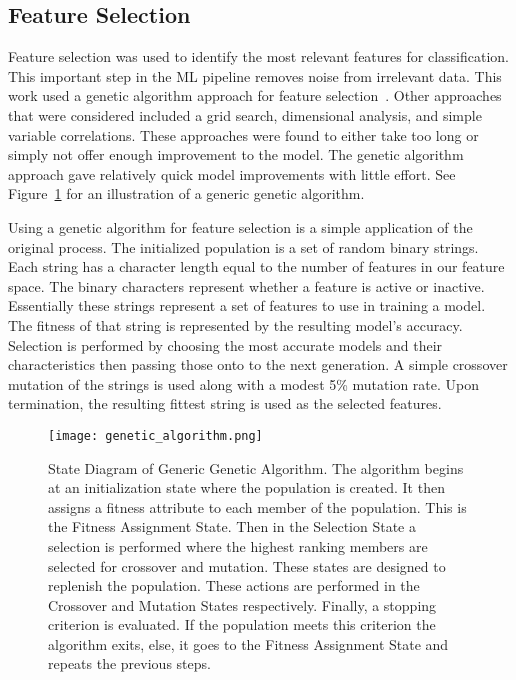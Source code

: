 \subsection{Feature Selection}
Feature selection was used to identify the most relevant features for classification.
This important step in the \ac{ML} pipeline removes noise from irrelevant data.
This work used a genetic algorithm approach for feature selection~\cite{yang1998feature}.
Other approaches that were considered included a grid search, dimensional analysis, and simple variable correlations.
These approaches were found to either take too long or simply not offer enough improvement to the model.
The genetic algorithm approach gave relatively quick model improvements with little effort.
See Figure~\ref{fig:GA} for an illustration of a generic genetic algorithm.

\par
Using a genetic algorithm for feature selection is a simple application of the original process.
The initialized population is a set of random binary strings.
Each string has a character length equal to the number of features in our feature space.
The binary characters represent whether a feature is active or inactive.
Essentially these strings represent a set of features to use in training a model.
The fitness of that string is represented by the resulting model's accuracy.
Selection is performed by choosing the most accurate models and their characteristics then passing those onto to the next generation.
A simple crossover mutation of the strings is used along with a modest 5\% mutation rate.
Upon termination, the resulting fittest string is used as the selected features.


\begin{figure}[htp]
    \centering
    \caption{State Diagram of Generic Genetic Algorithm.
    The algorithm begins at an initialization state where the population is created.
    It then assigns a fitness attribute to each member of the population.
    This is the Fitness Assignment State.
    Then in the Selection State a selection is performed where the highest ranking members are selected for crossover and mutation.
    These states are designed to replenish the population.
    These actions are performed in the Crossover and Mutation States respectively.
    Finally, a stopping criterion is evaluated.
    If the population meets this criterion the algorithm exits, else, it goes to the Fitness Assignment State and repeats the previous steps.}
    \label{fig:GA}
    \texttt{[image: genetic\_algorithm.png]}
\end{figure}

